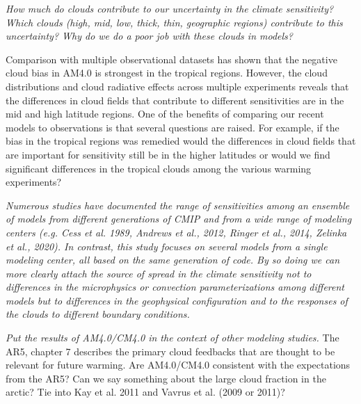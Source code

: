 \documentclass[draft]{agujournal2019}
\begin{document}
\textit{How much do clouds contribute to our uncertainty in the climate sensitivity?  
Which clouds (high, mid, low, thick, thin, geographic regions) contribute to this uncertainty?
Why do we do a poor job with these clouds in models? }



Comparison with multiple observational datasets has shown that the negative cloud bias
in AM4.0 is strongest in the tropical regions.  However, the cloud distributions and 
cloud radiative effects across multiple experiments reveals that the differences in cloud fields that 
contribute to different sensitivities are in the mid and high latitude regions.  One of the benefits of comparing 
our recent models to observations is that several questions are raised.  For example, if the bias in 
the tropical regions was remedied would the differences in cloud fields that are important for sensitivity
still be in the higher latitudes or would we find significant differences in the tropical clouds among 
the various warming experiments?     

\textit{Numerous studies have documented the range of sensitivities among an ensemble of models from different
generations of CMIP and from a wide range of modeling centers (e.g. Cess et al. 1989, Andrews et al., 2012, Ringer et al., 2014, Zelinka et al., 2020).  
In contrast, this study focuses on several models from a single modeling center, all based on the same generation of code.  By so doing we can more clearly attach the source of spread in the climate sensitivity not to 
differences in the microphysics or convection parameterizations among different models but to differences in the geophysical configuration and to the 
responses of the clouds to different boundary conditions.}


\textit{Put the results of AM4.0/CM4.0 in the context of other modeling studies.}  
The AR5, chapter 7 describes the primary 
cloud feedbacks that are thought to be relevant for future warming.  Are AM4.0/CM4.0 consistent with the expectations from the AR5?  Can we say something about the large cloud fraction in the arctic?  Tie into Kay et al. 2011 and Vavrus et al. (2009 or 2011)?
\end{document}
